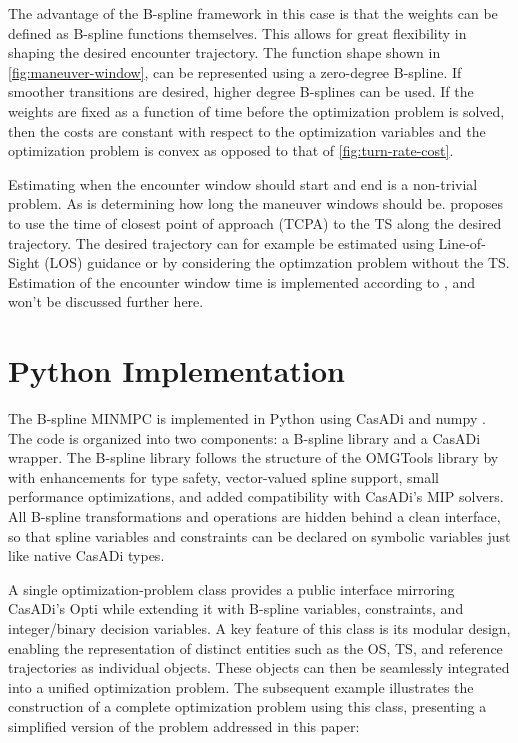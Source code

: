 The advantage of the B-spline framework in this case is that the weights can be defined as B-spline functions themselves. This allows for great flexibility in shaping the desired encounter trajectory. The function shape shown in \cref{fig:maneuver-window}, can be represented using a zero-degree B-spline. If smoother transitions are desired, higher degree B-splines can be used.
If the weights are fixed as a function of time before the optimization problem is solved, then the costs are constant with respect to the optimization variables and the optimization problem is convex as opposed to that of \cref{fig:turn-rate-cost}.

Estimating when the encounter window should start and end is a non-trivial problem. As is determining how long the maneuver windows should be. \cite{Thyri2022-MPC} proposes to use the time of closest point of approach (TCPA) to the TS along the desired trajectory. The desired trajectory can for example be estimated using Line-of-Sight (LOS) guidance \citep{Fossen2011-Handbook} or by considering the optimzation problem without the TS. Estimation of the encounter window time is implemented according to \cite{Thyri2022-MPC}, and won't be discussed further here.


\section{Python Implementation}\label{sec:python-implementation}

The B-spline MINMPC is implemented in Python using CasADi \citep{casadi} and numpy \citep{numpy}. The code is organized into two components: a B-spline library and a CasADi wrapper. The B-spline library follows the structure of the OMGTools library by \citet{mercy2016spline} with enhancements for type safety, vector-valued spline support, small performance optimizations, and added compatibility with CasADi’s MIP solvers. All B-spline transformations and operations are hidden behind a clean interface, so that spline variables and constraints can be declared on symbolic variables just like native CasADi types.

A single optimization-problem class provides a public interface mirroring CasADi’s Opti while extending it with B-spline variables, constraints, and integer/binary decision variables. 
A key feature of this class is its modular design, enabling the representation of distinct entities such as the OS, TS, and reference trajectories as individual objects. These objects can then be seamlessly integrated into a unified optimization problem.  The subsequent example illustrates the construction of a complete optimization problem using this class, presenting a simplified version of the problem addressed in this paper:

